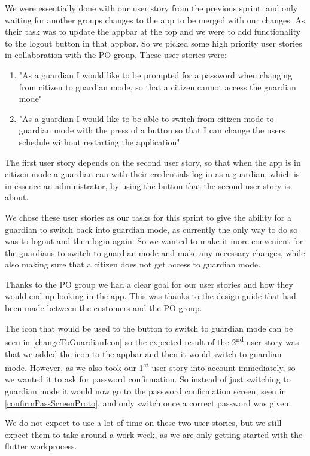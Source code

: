 We were essentially done with our user story from the previous sprint, and only waiting for another groups changes to the app to be merged with our changes. 
As their task was to update the appbar at the top and we were to add functionality to the logout button in that appbar.
So we picked some high priority user stories in collaboration with the PO group.
These user stories were:

\begin{enumerate}
\item "As a guardian I would like to be prompted for a password when changing from citizen to guardian mode, so that a citizen cannot access the guardian mode"
\item "As a guardian I would like to be able to switch from citizen mode to guardian mode with the press of a button so that I can change the users schedule without restarting the application"
\end{enumerate}

The first user story depends on the second user story, so that when the app is in citizen mode a guardian can with their credentials log in as a guardian, which is in essence an administrator, by using the button that the second user story is about. 

We chose these user stories as our tasks for this sprint to give the ability for a guardian to switch back into guardian mode, as currently the only way to do so was to logout and then login again. 
So we wanted to make it more convenient for the guardians to switch to guardian mode and make any necessary changes, while also making sure that a citizen does not get access to guardian mode.

Thanks to the PO group we had a clear goal for our user stories and how they would end up looking in the app. 
This was thanks to the design guide that had been made between the customers and the PO group.

The icon that would be used to the button to switch to guardian mode can be seen in \ref{changeToGuardianIcon} so the expected result of the 2\textsuperscript{nd} user story was that we added the icon to the appbar and then it would switch to guardian mode. 
However, as we also took our 1\textsuperscript{st} user story into account immediately, so we wanted it to ask for password confirmation. 
So instead of just switching to guardian mode it would now go to the password confirmation screen, seen in \ref{confirmPassScreenProto}, and only switch once a correct password was given.


We do not expect to use a lot of time on these two user stories, but we still expect them to take around a work week, as we are only getting started with the flutter workprocess.
